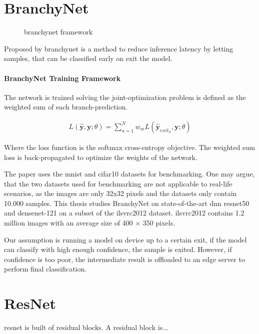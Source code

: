 \section{BranchyNet}

\begin{figure}
	branchynet framework
\end{figure}

Proposed by \citeauthor{teerapittayanon_branchynet:_2016} \gls{branchynet} \cite{teerapittayanon_branchynet:_2016} is a method to reduce inference latency by letting samples, that can be classified early on exit the model.

\paragraph{BranchyNet Training Framework}

The network is trained solving the joint-optimization problem is defined as the weighted sum of each branch-prediction.

\begin{align*}
L(\hat{\mathbf{y}},\mathbf{y};\theta) = \sum_{n=1}^{N} w_m L(\hat{\mathbf{y}}_{exit_n},\mathbf{y};\theta)
\end{align*}

Where the loss function is the softmax cross-entropy objective.
The weighted sum loss is back-propagated to optimize the weights of the network. 

The paper uses the \gls{mnist} and \gls{cifar10} datasets for benchmarking. One may argue, that the two datasets used for benchmarking are not applicable to real-life scenarios, as the images are only 32x32 pixels and the datasets only contain 10.000 samples. This thesis studies BranchyNet on state-of-the-art \gls{dnn} \gls{resnet}50 and \gls{densenet}-121 on a subset of the \gls{ilsvrc2012} dataset. \gls{ilsvrc2012} contains 1.2 million images with an average size of 400 $\times$ 350 pixels.

Our assumption is running a model on device up to a certain exit, if the model can classify with high enough confidence, the sample is exited. However, if confidence is too poor, the intermediate result is offloaded to an edge server to perform final classification.  

\section{ResNet}

\gls{resnet} is built of residual blocks. A residual block is...


